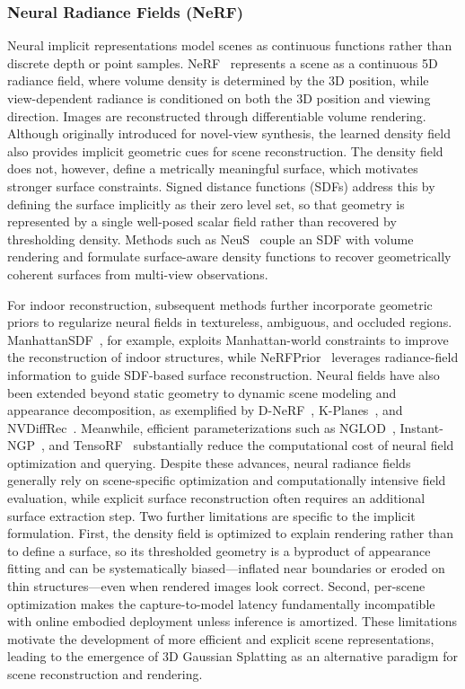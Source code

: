 \documentclass{SCIS2026}
\begin{document}
\subsubsection{Neural Radiance Fields (NeRF)}
Neural implicit representations model scenes as continuous functions rather than discrete depth or point samples. NeRF~\cite{mildenhall2021nerf} represents a scene as a continuous 5D radiance field, where volume density is determined by the 3D position, while view-dependent radiance is conditioned on both the 3D position and viewing direction. Images are reconstructed through differentiable volume rendering. Although originally introduced for novel-view synthesis, the learned density field also provides implicit geometric cues for scene reconstruction. The density field does not, however, define a metrically meaningful surface, which motivates stronger surface constraints. Signed distance functions (SDFs) address this by defining the surface implicitly as their zero level set, so that geometry is represented by a single well-posed scalar field rather than recovered by thresholding density. Methods such as NeuS~\cite{wang2021neus} couple an SDF with volume rendering and formulate surface-aware density functions to recover geometrically coherent surfaces from multi-view observations.

For indoor reconstruction, subsequent methods further incorporate geometric priors to regularize neural fields in textureless, ambiguous, and occluded regions. ManhattanSDF~\cite{guo2022neural}, for example, exploits Manhattan-world constraints to improve the reconstruction of indoor structures, while NeRFPrior~\cite{zhang2025nerfprior} leverages radiance-field information to guide SDF-based surface reconstruction. Neural fields have also been extended beyond static geometry to dynamic scene modeling and appearance decomposition, as exemplified by D-NeRF~\cite{pumarola2021d}, K-Planes~\cite{fridovich2023k}, and NVDiffRec~\cite{munkberg2022extracting}. Meanwhile, efficient parameterizations such as NGLOD~\cite{takikawa2021neural}, Instant-NGP~\cite{muller2022instant}, and TensoRF~\cite{chen2022tensorf} substantially reduce the computational cost of neural field optimization and querying.
Despite these advances, neural radiance fields generally rely on scene-specific optimization and computationally intensive field evaluation, while explicit surface reconstruction often requires an additional surface extraction step. Two further limitations are specific to the implicit formulation. First, the density field is optimized to explain rendering rather than to define a surface, so its thresholded geometry is a byproduct of appearance fitting and can be systematically biased---inflated near boundaries or eroded on thin structures---even when rendered images look correct. Second, per-scene optimization makes the capture-to-model latency fundamentally incompatible with online embodied deployment unless inference is amortized. These limitations motivate the development of more efficient and explicit scene representations, leading to the emergence of 3D Gaussian Splatting as an alternative paradigm for scene reconstruction and rendering.
\end{document}
